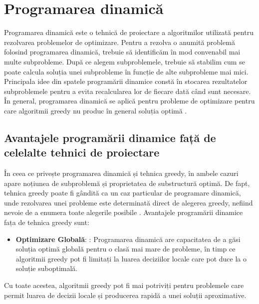 

\lstset{style=mystyle}

\chapter{Programarea dinamică}
Programarea dinamică este o tehnică de proiectare a algoritmilor utilizată pentru rezolvarea problemelor de optimizare.
Pentru a rezolva o anumită problemă folosind programarea dinamică, trebuie să identificăm în mod convenabil mai multe subprobleme.
După ce alegem subproblemele, trebuie să stabilim cum se poate calcula soluția unei subprobleme în funcție de alte subprobleme mai mici.
Principala idee din spatele programării dinamice constă în stocarea rezultatelor subproblemele pentru a evita recalcularea lor de fiecare dată când sunt necesare. În general, programarea dinamică se aplică pentru probleme de optimizare pentru care algoritmii greedy nu produc în general soluția optimă \citep{Curs}. 

\section{Avantajele programării dinamice față de celelalte tehnici de proiectare}
În ceea ce privește programarea dinamică și tehnica greedy, 
în ambele cazuri apare noțiunea de subproblemă și proprietatea de substructură optimă. De fapt, tehnica greedy poate fi gândită ca un caz particular de programare dinamică, unde rezolvarea unei probleme este determinată direct de alegerea greedy, nefiind nevoie de a
enumera toate alegerile posibile \citep{Curs}. Avantajele programării dinamice fața de tehnica greedy sunt:
\begin{itemize}
  \item \textbf {Optimizare Globală}: : Programarea dinamică are capacitatea de a găsi soluția optimă globală pentru o clasă mai mare de probleme, în timp ce algoritmii greedy pot fi limitați la luarea deciziilor locale care pot duce la o soluție suboptimală.
  
\end{itemize}
Cu toate acestea, algoritmii greedy pot fi mai potriviți pentru problemele care permit luarea de decizii locale și producerea rapidă a unei soluții aproximative.



